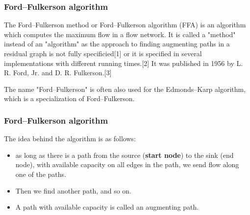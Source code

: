\begin{frame}
\frametitle{Ford–Fulkerson algorithm}
The Ford–Fulkerson method or Ford–Fulkerson algorithm (FFA) is an algorithm which computes the maximum flow in a flow network. It is called a "method" instead of an "algorithm" as the approach to finding augmenting paths in a residual graph is not fully specificied[1] or it is specified in several implementations with different running times.[2] It was published in 1956 by L. R. Ford, Jr. and D. R. Fulkerson.[3] 

The name "Ford–Fulkerson" is often also used for the Edmonds–Karp algorithm, which is a specialization of Ford–Fulkerson.
\end{frame}
\begin{frame}
\frametitle{Ford–Fulkerson algorithm}

The idea behind the algorithm is as follows: 
\begin{itemize}
\item as long as there is a path from the source (\textbf{start node}) to the sink (end node), with available capacity on all edges in the path, we send flow along one of the paths. \item Then we find another path, and so on. 
\item A path with available capacity is called an augmenting path.
\end{itemize}
\end{frame}
